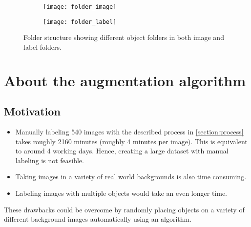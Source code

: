 \documentclass[paper=a4,11pt,parskip=half,toc=listof]{scrartcl}
\begin{document}
\begin{center}
	\begin{figure}[!htb]
		\begin{subfigure}{.5\textwidth}
			\centering
			\texttt{[image: folder\_image]}
			\label{Fig:6a}
		\end{subfigure}
		\begin{subfigure}{.5\textwidth}
			\centering
			\texttt{[image: folder\_label]}
			\label{Fig:6b}
		\end{subfigure}
		\caption{Folder structure showing different object folders in both image and label folders.}
		\label{Fig:6}
	\end{figure}
\end{center}

\section{About the augmentation algorithm}
\subsection{Motivation}
	\begin{itemize}
		\item Manually labeling 540 images with the described process in \ref{section:process} takes roughly 2160 minutes (roughly 4 minutes per image). This is equivalent to around 4 working days. Hence, creating a large dataset with manual labeling is not feasible.
		\item Taking images in a variety of real world backgrounds is also time consuming.
		\item Labeling images with multiple objects would take an even longer time.
	\end{itemize}
	
These drawbacks could be overcome by randomly placing objects on a variety of different background images automatically using an algorithm.
\end{document}

